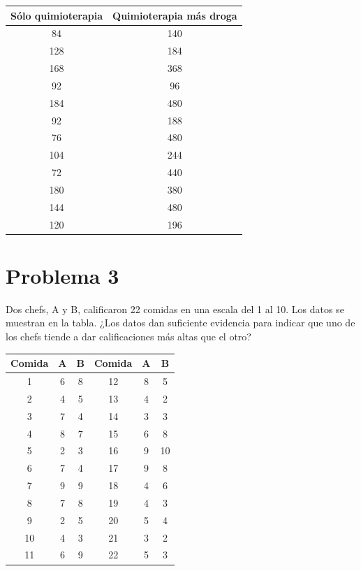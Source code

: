 \documentclass{article}
\begin{document}
\begin{center}
    \begin{tabular}{c c}
        Sólo quimioterapia & Quimioterapia más droga \\
        \hline
        84                 & 140                     \\
        128                & 184                     \\
        168                & 368                     \\
        92                 & 96                      \\
        184                & 480                     \\
        92                 & 188                     \\
        76                 & 480                     \\
        104                & 244                     \\
        72                 & 440                     \\
        180                & 380                     \\
        144                & 480                     \\
        120                & 196                     \\
    \end{tabular}
\end{center}

\section{Problema 3}

Dos chefs, A y B, calificaron 22 comidas en una escala del 1 al 10. Los datos se muestran en la tabla. ¿Los datos dan suficiente evidencia para indicar que uno de los chefs tiende a dar calificaciones más altas que el otro?
\begin{center}
    \begin{tabular}{c c c| c c c}
        Comida & A & B & Comida & A & B  \\
        \hline
        1      & 6 & 8 & 12     & 8 & 5  \\
        2      & 4 & 5 & 13     & 4 & 2  \\
        3      & 7 & 4 & 14     & 3 & 3  \\
        4      & 8 & 7 & 15     & 6 & 8  \\
        5      & 2 & 3 & 16     & 9 & 10 \\
        6      & 7 & 4 & 17     & 9 & 8  \\
        7      & 9 & 9 & 18     & 4 & 6  \\
        8      & 7 & 8 & 19     & 4 & 3  \\
        9      & 2 & 5 & 20     & 5 & 4  \\
        10     & 4 & 3 & 21     & 3 & 2  \\
        11     & 6 & 9 & 22     & 5 & 3  \\
    \end{tabular}
\end{center}
\end{document}
